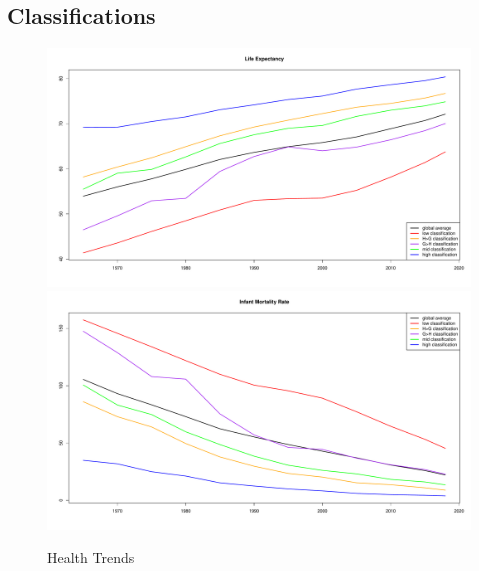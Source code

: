\documentclass[12pt]{article}
\begin{document}
\subsection{Classifications}


\begin{figure}[!htb]
    \centering
    \caption{Health Trends}
    \label{trends}
    \includegraphics[width=\textwidth]{trend_life_exp_wpp.pdf}
    \includegraphics[width=\textwidth]{trend_imr_wpp.pdf}
\end{figure}
\end{document}
